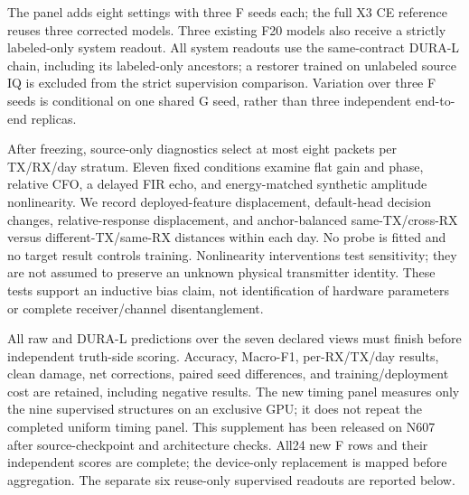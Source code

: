The panel adds eight settings with three F seeds each; the full X3 CE
reference reuses three corrected models. Three existing F20 models also
receive a strictly labeled-only system readout. All system readouts use
the same-contract DURA-L chain, including its labeled-only ancestors;
a restorer trained on unlabeled source IQ is excluded from the strict
supervision comparison. Variation over three F seeds is conditional on
one shared G seed, rather than three independent end-to-end replicas.

After freezing, source-only diagnostics select at most eight packets per
TX/RX/day stratum. Eleven fixed conditions examine flat gain and phase,
relative CFO, a delayed FIR echo, and energy-matched synthetic amplitude
nonlinearity. We record deployed-feature displacement, default-head
decision changes, relative-response displacement, and anchor-balanced
same-TX/cross-RX versus different-TX/same-RX distances within each day.
No probe is fitted and no target result controls training. Nonlinearity
interventions test sensitivity; they are not assumed to preserve an
unknown physical transmitter identity. These tests support an inductive
bias claim, not identification of hardware parameters or complete
receiver/channel disentanglement.

All raw and DURA-L predictions over the seven declared views must finish
before independent truth-side scoring. Accuracy, Macro-F1, per-RX/TX/day
results, clean damage, net corrections, paired seed differences, and
training/deployment cost are retained, including negative results.
The new timing panel measures only the nine supervised structures on an
exclusive GPU; it does not repeat the completed uniform timing panel.
This supplement has been released on N607 after source-checkpoint and
architecture checks. All24 new F rows and their independent scores are complete;
the device-only replacement is mapped before aggregation.
The separate six reuse-only supervised readouts are reported below.
